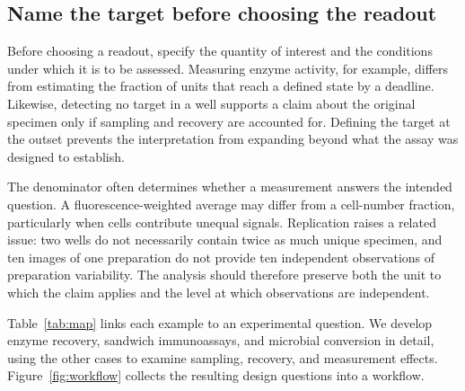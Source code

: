 \documentclass[11pt]{article}
\begin{document}
\subsection{Name the target before choosing the readout}
Before choosing a readout, specify the quantity of interest and the conditions under which it is to be assessed. Measuring enzyme activity, for example, differs from estimating the fraction of units that reach a defined state by a deadline. Likewise, detecting no target in a well supports a claim about the original specimen only if sampling and recovery are accounted for. Defining the target at the outset prevents the interpretation from expanding beyond what the assay was designed to establish.

The denominator often determines whether a measurement answers the intended question. A fluorescence-weighted average may differ from a cell-number fraction, particularly when cells contribute unequal signals. Replication raises a related issue: two wells do not necessarily contain twice as much unique specimen, and ten images of one preparation do not provide ten independent observations of preparation variability. The analysis should therefore preserve both the unit to which the claim applies and the level at which observations are independent.

Table~\ref{tab:map} links each example to an experimental question. We develop enzyme recovery, sandwich immunoassays, and microbial conversion in detail, using the other cases to examine sampling, recovery, and measurement effects. Figure~\ref{fig:workflow} collects the resulting design questions into a workflow.
\end{document}
